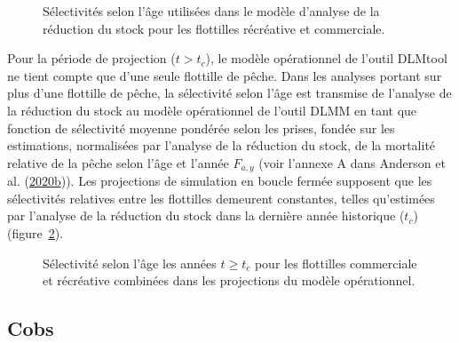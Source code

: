 \documentclass[french,11pt]{book}
\begin{document}
\begin{figure}[htb]

{\centering {} 

}

\caption{Sélectivités selon l'âge utilisées dans le modèle d'analyse de la réduction du stock pour les flottilles récréative et commerciale.}\label{fig:sra-selectivity}
\end{figure}
Pour la période de projection (\(t > t_c\)), le modèle opérationnel de l'outil DLMtool ne tient compte que d'une seule flottille de pêche. Dans les analyses portant sur plus d'une flottille de pêche, la sélectivité selon l'âge est transmise de l'analyse de la réduction du stock au modèle opérationnel de l'outil DLMM en tant que fonction de sélectivité moyenne pondérée selon les prises, fondée sur les estimations, normalisées par l'analyse de la réduction du stock, de la mortalité relative de la pêche selon l'âge et l'année \(F_{a,y}\) (voir l'annexe A dans Anderson et al. (\protect\hyperlink{ref-anderson2020gfmp}{2020}\protect\hyperlink{ref-anderson2020gfmp}{b})). Les projections de simulation en boucle fermée supposent que les sélectivités relatives entre les flottilles demeurent constantes, telles qu'estimées par l'analyse de la réduction du stock dans la dernière année historique (\(t_c\)) (figure~\ref{fig:om-selectivity}).


\begin{figure}[htb]

{\centering {} 

}

\caption{Sélectivité selon l'âge les années \(t \geq t_c\) pour les flottilles commerciale et récréative combinées dans les projections du modèle opérationnel.}\label{fig:om-selectivity}
\end{figure}
\clearpage

\label{app:desc-obs-yelloweye}

\subsection{Cobs}
\label{app:desc-obs-cobs-yelloweye}
\end{document}
